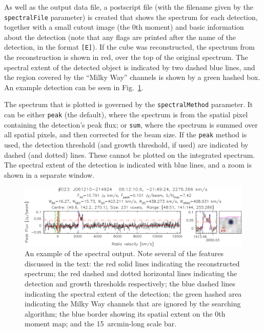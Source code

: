 


As well as the output data file, a postscript file (with the filename
given by the \texttt{spectralFile} parameter) is created that shows
the spectrum for each detection, together with a small cutout image
(the 0th moment) and basic information about the detection (note that
any flags are printed after the name of the detection, in the format
\texttt{[E]}). If the cube was reconstructed, the spectrum from the
reconstruction is shown in red, over the top of the original
spectrum. The spectral extent of the detected object is indicated by
two dashed blue lines, and the region covered by the ``Milky Way''
channels is shown by a green hashed box. An example detection can be
seen in Fig.~\ref{fig-spect}.

The spectrum that is plotted is governed by the
\texttt{spectralMethod} parameter. It can be either \texttt{peak} (the
default), where the spectrum is from the spatial pixel containing the
detection's peak flux; or \texttt{sum}, where the spectrum is summed
over all spatial pixels, and then corrected for the beam size. If the
\texttt{peak} method is used, the detection threshold (and growth
threshold, if used) are indicated by dashed (and dotted) lines. These
cannot be plotted on the integrated spectrum. The spectral extent of
the detection is indicated with blue lines, and a zoom is shown in a
separate window.

\begin{figure}[t]
  \begin{center}
    \includegraphics[width=\textwidth]{example_spectrum}
  \end{center}
  \caption{\footnotesize An example of the spectral output. Note
    several of the features discussed in the text: the red solid lines
    indicating the reconstructed spectrum; the red dashed and dotted
    horizontal lines indicating the detection and growth thresholds
    respectively; the blue dashed lines indicating the spectral extent
    of the detection; the green hashed area indicating the Milky Way
    channels that are ignored by the searching algorithm; the blue
    border showing its spatial extent on the 0th moment map; and the
    15~arcmin-long scale bar.}
  \label{fig-spect}
\end{figure}

